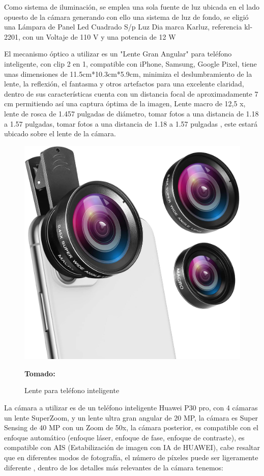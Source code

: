 \documentclass[12pt,twocolumn,a4paper]{article}
\begin{document}
Como sistema de iluminación, se emplea una sola fuente de  luz  ubicada en el lado opuesto de la  cámara generando con ello una sistema de luz de fondo, se eligió una Lámpara  de Panel Led  Cuadrado S/p Luz Dia marca Karluz,  referencia kl-2201, con un Voltaje de 110 V  y una potencia de 12 W \cite{lampara} 

El mecanismo óptico a utilizar es un "Lente Gran Angular" para teléfono inteligente, con clip 2 en 1,  compatible con iPhone, Samsung, Google Pixel, tiene unas dimensiones de 11.5cm*10.3cm*5.9cm, minimiza el deslumbramiento de la lente, la reflexión, el fantasma y otros artefactos para una excelente claridad,  dentro de sus características cuenta con un distancia focal de aproximadamente 7 cm permitiendo así una captura óptima de la imagen, Lente macro de 12,5 x,  lente de rosca de 1.457 pulgadas de diámetro, tomar fotos a una distancia de 1.18 a 1.57 pulgadas, tomar fotos a una distancia de 1.18 a 1.57 pulgadas \cite{lente}, este estará ubicado sobre el lente de la cámara.

\begin{figure}
	\centering
	\includegraphics[scale=0.05]{lente.jpg}
	\caption{Lente para teléfono inteligente} \textbf{Tomado:} \cite{lente}
	\label{lente}
\end{figure}

La cámara a utilizar es de un teléfono inteligente Huawei P30 pro, con 4 cámaras un lente SuperZoom, y un  lente ultra gran angular de 20 MP, la cámara es Super Sensing de 40 MP con un Zoom de 50x, la cámara posterior, es compatible con el enfoque automático (enfoque láser, enfoque de fase, enfoque de contraste), es compatible con AIS (Estabilización de imagen con IA de HUAWEI), cabe resaltar que en diferentes modos de fotografía, el número de píxeles puede ser ligeramente diferente \cite{Hawei}, dentro de los detalles más relevantes de la cámara tenemos:
\end{document}
